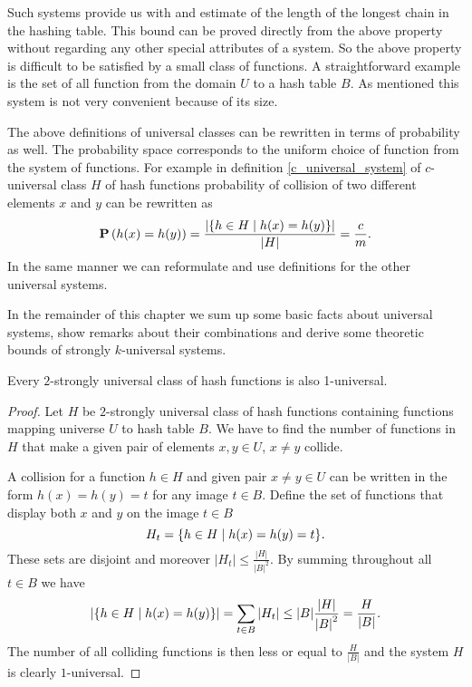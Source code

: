 Such systems provide us with and estimate of the length of the longest chain in the hashing table. This bound can be proved directly from the above property without regarding any other special attributes of a system. So the above property is difficult to be satisfied by a small class of functions. A straightforward example is the set of all function from the domain $U$ to a hash table $B$. As mentioned this system is not very convenient because of its size.

The above definitions of universal classes can be rewritten in terms of probability as well. The probability space corresponds to the uniform choice of function from the system of functions. For example in definition \ref{c_universal_system} of $c$-universal class $H$ of hash functions probability of collision of two different elements $x$ and $y$ can be rewritten as
\[
	\mathbf{P}\left(h(x) = h(y)\right) = \frac{|\{h \in H \mid h(x) = h(y)\}|}{|H|} = \frac{c}{m} \text{.}
\]
In the same manner we can reformulate and use definitions for the other universal systems.

In the remainder of this chapter we sum up some basic facts about universal systems, show remarks about their combinations and derive some theoretic bounds of strongly $k$-universal systems.
\begin{remark}
Every $2$-strongly universal class of hash functions is also 1-universal.
\end{remark}
\begin{proof}
Let $H$ be $2$-strongly universal class of hash functions containing functions mapping universe $U$ to hash table $B$. We have to find the number of functions in $H$ that make a given pair of elements $x, y \in U$, $x \neq y$ collide. 

A collision for a function $h \in H$ and given pair $x \neq y \in U$ can be written in the form $h(x) = h(y) = t$ for any image $t \in B$. Define the set of functions that display both $x$ and $y$ on the image $t \in B$ \[ H_t = \lbrace h \in H \mid h(x) = h(y) = t \rbrace \textit{.} \] These sets are disjoint and moreover $|H_t| \leq \frac{|H|}{{|B|}^{2}}$. By summing throughout all $t \in B$ we have
\begin{displaymath}
|\lbrace h \in H \mid h(x) = h(y) \rbrace | = \displaystyle \sum_{t \in B} |H_t| \leq |B| \frac{|H|}{{|B|}^{2}} = \frac{H}{|B|}\textit{.}
\end{displaymath}
The number of all colliding functions is then less or equal to $\frac{H}{|B|}$ and the system $H$ is clearly $1$-universal.
\end{proof}

